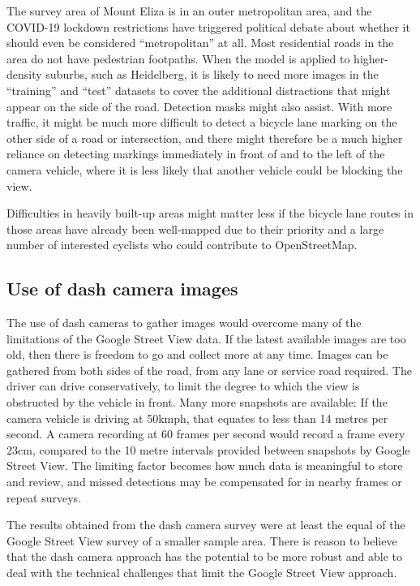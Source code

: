 \documentclass[11pt,twoside]{report}
\begin{document}
The survey area of Mount Eliza is in an outer metropolitan area, and the COVID-19 lockdown restrictions have triggered political debate about whether it should even be considered ``metropolitan'' at all.  Most residential roads in the area do not have pedestrian footpaths.  When the model is applied to higher-density suburbs, such as Heidelberg, it is likely to need more images in the ``training'' and ``test'' datasets to cover the additional distractions that might appear on the side of the road.  Detection masks might also assist.  With more traffic, it might be much more difficult to detect a bicycle lane marking on the other side of a road or intersection, and there might therefore be a much higher reliance on detecting markings immediately in front of and to the left of the camera vehicle, where it is less likely that another vehicle could be blocking the view.

Difficulties in heavily built-up areas might matter less if the bicycle lane routes in those areas have already been well-mapped due to their priority and a large number of interested cyclists who could contribute to OpenStreetMap.


\subsection{Use of dash camera images}

The use of dash cameras to gather images would overcome many of the limitations of the Google Street View data.  If the latest available images are too old, then there is freedom to go and collect more at any time.  Images can be gathered from both sides of the road, from any lane or service road required.  The driver can drive conservatively, to limit the degree to which the view is obstructed by the vehicle in front.  Many more snapshots are available:  If the camera vehicle is driving at 50kmph, that equates to less than 14 metres per second.  A camera recording at 60 frames per second would record a frame every 23cm, compared to the 10 metre intervals provided between snapshots by Google Street View.  The limiting factor becomes how much data is meaningful to store and review, and missed detections may be compensated for in nearby frames or repeat surveys.

The results obtained from the dash camera survey were at least the equal of the Google Street View survey of a smaller sample area.  There is reason to believe that the dash camera approach has the potential to be more robust and able to deal with the technical challenges that limit the Google Street View approach.
\end{document}
